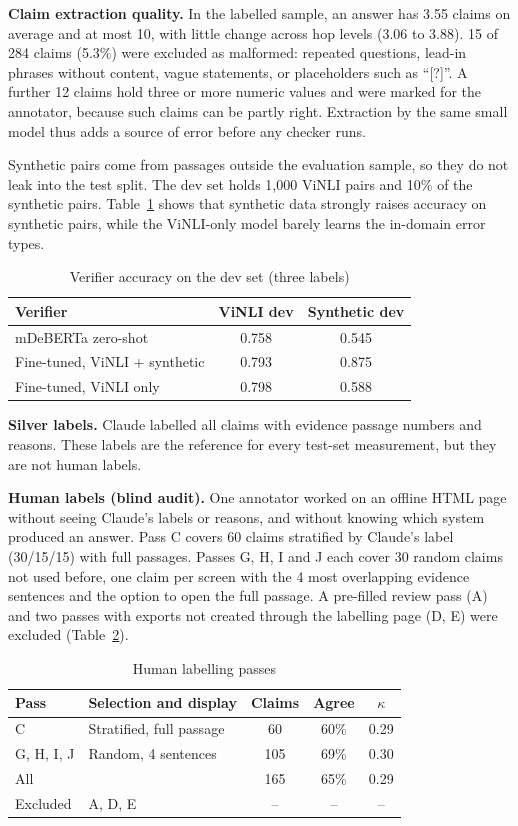 \documentclass[conference]{IEEEtran}
\begin{document}
\textbf{Claim extraction quality.} In the labelled sample, an answer has 3.55 claims on average and at most 10, with little change across hop levels (3.06 to 3.88). 15 of 284 claims (5.3\%) were excluded as malformed: repeated questions, lead-in phrases without content, vague statements, or placeholders such as ``[?]''. A further 12 claims hold three or more numeric values and were marked for the annotator, because such claims can be partly right. Extraction by the same small model thus adds a source of error before any checker runs.

Synthetic pairs come from passages outside the evaluation sample, so they do not leak into the test split. The dev set holds 1,000 ViNLI pairs and 10\% of the synthetic pairs. Table~\ref{tab:dev} shows that synthetic data strongly raises accuracy on synthetic pairs, while the ViNLI-only model barely learns the in-domain error types.

\begin{table}[t]
\caption{Verifier accuracy on the dev set (three labels)}
\label{tab:dev}
\centering
\footnotesize
\begin{tabular}{lcc}
\toprule
Verifier & ViNLI dev & Synthetic dev \\
\midrule
mDeBERTa zero-shot & 0.758 & 0.545 \\
Fine-tuned, ViNLI + synthetic & 0.793 & 0.875 \\
Fine-tuned, ViNLI only & 0.798 & 0.588 \\
\bottomrule
\end{tabular}
\end{table}

\textbf{Silver labels.} Claude labelled all claims with evidence passage numbers and reasons. These labels are the reference for every test-set measurement, but they are not human labels.

\textbf{Human labels (blind audit).} One annotator worked on an offline HTML page without seeing Claude's labels or reasons, and without knowing which system produced an answer. Pass C covers 60 claims stratified by Claude's label (30/15/15) with full passages. Passes G, H, I and J each cover 30 random claims not used before, one claim per screen with the 4 most overlapping evidence sentences and the option to open the full passage. A pre-filled review pass (A) and two passes with exports not created through the labelling page (D, E) were excluded (Table~\ref{tab:audit}).

\begin{table}[t]
\caption{Human labelling passes}
\label{tab:audit}
\centering
\footnotesize
\begin{tabular}{p{}p{}ccc}
\toprule
Pass & Selection and display & Claims & Agree & $\kappa$ \\
\midrule
C & Stratified, full passage & 60 & 60\% & 0.29 \\
G, H, I, J & Random, 4 sentences & 105 & 69\% & 0.30 \\
All & & 165 & 65\% & 0.29 \\
Excluded & A, D, E & -- & -- & -- \\
\bottomrule
\end{tabular}
\end{table}
\end{document}

